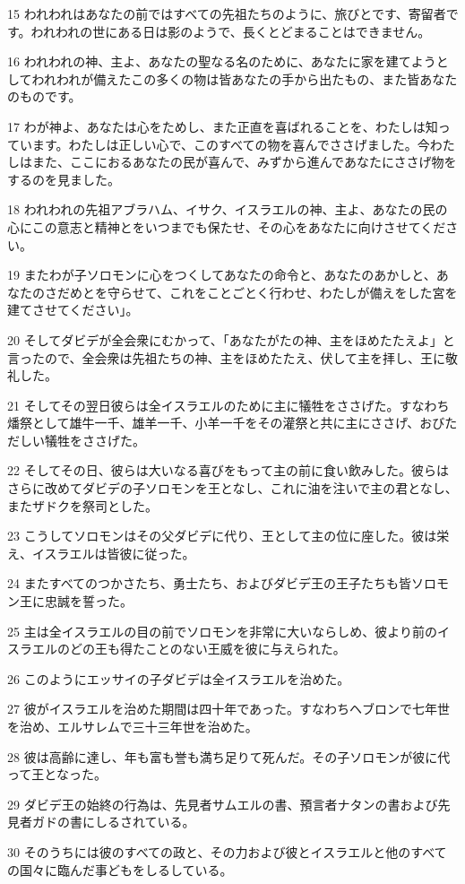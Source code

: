 \par 15 われわれはあなたの前ではすべての先祖たちのように、旅びとです、寄留者です。われわれの世にある日は影のようで、長くとどまることはできません。
\par 16 われわれの神、主よ、あなたの聖なる名のために、あなたに家を建てようとしてわれわれが備えたこの多くの物は皆あなたの手から出たもの、また皆あなたのものです。
\par 17 わが神よ、あなたは心をためし、また正直を喜ばれることを、わたしは知っています。わたしは正しい心で、このすべての物を喜んでささげました。今わたしはまた、ここにおるあなたの民が喜んで、みずから進んであなたにささげ物をするのを見ました。
\par 18 われわれの先祖アブラハム、イサク、イスラエルの神、主よ、あなたの民の心にこの意志と精神とをいつまでも保たせ、その心をあなたに向けさせてください。
\par 19 またわが子ソロモンに心をつくしてあなたの命令と、あなたのあかしと、あなたのさだめとを守らせて、これをことごとく行わせ、わたしが備えをした宮を建てさせてください」。
\par 20 そしてダビデが全会衆にむかって、「あなたがたの神、主をほめたたえよ」と言ったので、全会衆は先祖たちの神、主をほめたたえ、伏して主を拝し、王に敬礼した。
\par 21 そしてその翌日彼らは全イスラエルのために主に犠牲をささげた。すなわち燔祭として雄牛一千、雄羊一千、小羊一千をその灌祭と共に主にささげ、おびただしい犠牲をささげた。
\par 22 そしてその日、彼らは大いなる喜びをもって主の前に食い飲みした。彼らはさらに改めてダビデの子ソロモンを王となし、これに油を注いで主の君となし、またザドクを祭司とした。
\par 23 こうしてソロモンはその父ダビデに代り、王として主の位に座した。彼は栄え、イスラエルは皆彼に従った。
\par 24 またすべてのつかさたち、勇士たち、およびダビデ王の王子たちも皆ソロモン王に忠誠を誓った。
\par 25 主は全イスラエルの目の前でソロモンを非常に大いならしめ、彼より前のイスラエルのどの王も得たことのない王威を彼に与えられた。
\par 26 このようにエッサイの子ダビデは全イスラエルを治めた。
\par 27 彼がイスラエルを治めた期間は四十年であった。すなわちヘブロンで七年世を治め、エルサレムで三十三年世を治めた。
\par 28 彼は高齢に達し、年も富も誉も満ち足りて死んだ。その子ソロモンが彼に代って王となった。
\par 29 ダビデ王の始終の行為は、先見者サムエルの書、預言者ナタンの書および先見者ガドの書にしるされている。
\par 30 そのうちには彼のすべての政と、その力および彼とイスラエルと他のすべての国々に臨んだ事どもをしるしている。


